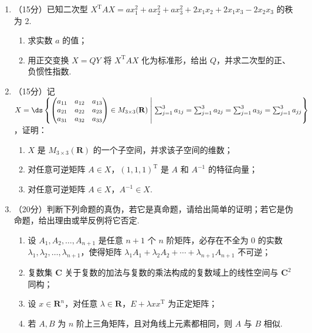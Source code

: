 \begin{enumerate}
    \item （15分）已知二次型 $X^{\mathrm{T}}AX=ax_1^2+ax_2^2+ax_3^2+2x_1x_2+2x_1x_3-2x_2x_3$ 的秩为 2.
    \begin{enumerate}
        \item 求实数 $a$ 的值；

        \item 用正交变换 $X=QY$ 将 $X^{\mathrm{T}}AX$ 化为标准形，给出 $Q$，并求二次型的正、负惯性指数.
    \end{enumerate}

    \item （15分）记 $X=\ds\left\{\begin{pmatrix}a_{11} & a_{12} & a_{13} \\ a_{21} & a_{22} & a_{23} \\ a_{31} & a_{32} & a_{33}\end{pmatrix} \in M_{3 \times 3}(\mathbf{R}) \;\middle|\; \sum_{j=1}^3a_{1j}=\sum_{j=1}^3a_{2j}=\sum_{j=1}^3a_{3j}=\sum_{j=1}^3a_{jj}\right\}$，证明：
    \begin{enumerate}
        \item $X$ 是 $M_{3 \times 3}(\mathbf{R})$ 的一个子空间，并求该子空间的维数；

        \item 对任意可逆矩阵 $A \in X$，$(1, 1, 1)^{\mathrm{T}}$ 是 $A$ 和 $A^{-1}$ 的特征向量；

        \item 对任意可逆矩阵 $A \in X$，$A^{-1} \in X$.
    \end{enumerate}

    \item （20分）判断下列命题的真伪，若它是真命题，请给出简单的证明；若它是伪命题，给出理由或举反例将它否定.
    \begin{enumerate}
        \item 设 $A_1, A_2, \ldots, A_{n+1}$ 是任意 $n+1$ 个 $n$ 阶矩阵，必存在不全为 0 的实数 $\lambda_1,\allowbreak \lambda_2,\allowbreak \ldots,\allowbreak \lambda_{n+1}$，使得矩阵 $\lambda_1A_1+\lambda_2A_2+\cdots+\lambda_{n+1}A_{n+1}$ 不可逆；

        \item 复数集 $\mathbf{C}$ 关于复数的加法与复数的乘法构成的复数域上的线性空间与 $\mathbf{C}^2$ 同构；

        \item 设 $x \in \mathbf{R}^n$，对任意 $\lambda \in \mathbf{R}$，$E+\lambda xx^{\mathrm{T}}$ 为正定矩阵；

        \item 若 $A, B$ 为 $n$ 阶上三角矩阵，且对角线上元素都相同，则 $A$ 与 $ B$ 相似.
    \end{enumerate}
\end{enumerate}

\clearpage
